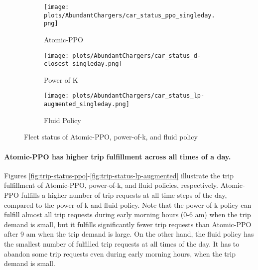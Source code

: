 \begin{figure}[h]
    \centering
    \begin{subfigure}{\linewidth}
        \centering
        \texttt{[image: plots/AbundantChargers/car\_status\_ppo\_singleday.png]}
        \caption{Atomic-PPO}
        \label{fig:fleet-status-ppo}
    \end{subfigure}
    \begin{subfigure}{\linewidth}
        \centering
        \texttt{[image: plots/AbundantChargers/car\_status\_d-closest\_singleday.png]}
        \caption{Power of K}
        \label{fig:fleet-status-d-closest}
    \end{subfigure}
    \begin{subfigure}{\linewidth}
        \centering
        \texttt{[image: plots/AbundantChargers/car\_status\_lp-augmented\_singleday.png]}
        \caption{Fluid Policy}
        \label{fig:fleet-status-lp-augmented}
    \end{subfigure}
    \caption{Fleet status of Atomic-PPO, power-of-k, and fluid policy}
    \label{fig:fleet-status}
\end{figure}

\paragraph{Atomic-PPO has higher trip fulfillment across all times of a day.} Figures \ref{fig:trip-status-ppo}-\ref{fig:trip-status-lp-augmented} illustrate the trip fulfillment of Atomic-PPO, power-of-k, and fluid policies, respectively. Atomic-PPO fulfills a higher number of trip requests at all time steps of the day, compared to the power-of-k and fluid-policy. Note that the power-of-k policy can fulfill almost all trip requests during early morning hours (0-6 am) when the trip demand is small, but it fulfills significantly fewer trip requests than Atomic-PPO after 9 am when the trip demand is large. On the other hand, the fluid policy has the smallest number of fulfilled trip requests at all times of the day. It has to abandon some trip requests even during early morning hours, when the trip demand is small. 


